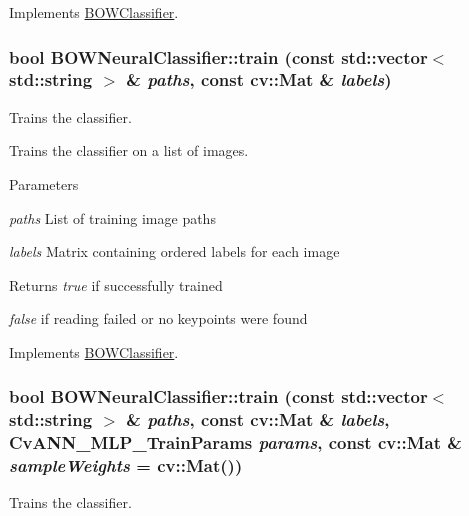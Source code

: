 Implements \hyperlink{classBOWClassifier_a63bff22f5005e1b79d9c4cd5e7a57748}{BOWClassifier}.

\hypertarget{classBOWNeuralClassifier_a8e29bc1d8b2fe3d3b362a5f224d5a095}{
\subsubsection[{train}]{\setlength{\rightskip}{0pt plus 5cm}bool BOWNeuralClassifier::train (const std::vector$<$ std::string $>$ \& {\em paths}, \/  const cv::Mat \& {\em labels})}}
\label{classBOWNeuralClassifier_a8e29bc1d8b2fe3d3b362a5f224d5a095}


Trains the classifier. 

Trains the classifier on a list of images.


\begin{DoxyParams}{Parameters}
\item[{\em paths}]List of training image paths \item[{\em labels}]Matrix containing ordered labels for each image \end{DoxyParams}
\begin{DoxyReturn}{Returns}
{\itshape true\/} if successfully trained\par
 {\itshape false\/} if reading failed or no keypoints were found 
\end{DoxyReturn}


Implements \hyperlink{classBOWClassifier_a8a00f5cadf166f361a411d5a4e67b4d6}{BOWClassifier}.

\hypertarget{classBOWNeuralClassifier_af5bde18bb49d45421ea1332dee9ff9fa}{
\subsubsection[{train}]{\setlength{\rightskip}{0pt plus 5cm}bool BOWNeuralClassifier::train (const std::vector$<$ std::string $>$ \& {\em paths}, \/  const cv::Mat \& {\em labels}, \/  CvANN\_\-MLP\_\-TrainParams {\em params}, \/  const cv::Mat \& {\em sampleWeights} = {\ttfamily cv::Mat()})}}
\label{classBOWNeuralClassifier_af5bde18bb49d45421ea1332dee9ff9fa}


Trains the classifier. 

